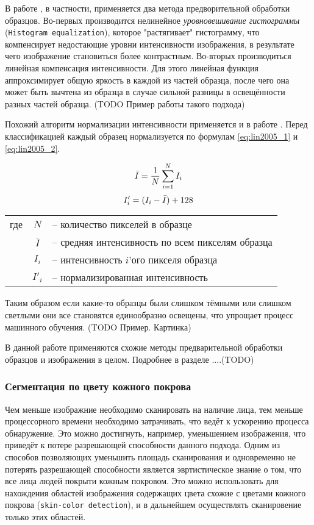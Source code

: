 \documentclass[12pt]{report}
\begin{document}
В работе \citep{rowley1998neural}, в частности, применяется два метода предворительной обработки образцов. Во-первых производится нелинейное \emph{уровновешивание гистограммы} (\texttt{Histogram equalization}), которое "растягивает" гистограмму, что компенсирует недостающие уровни интенсивности изображения, в результате чего изображение становиться более контрастным. Во-вторых производиться линейная компенсация интенсивности. Для этого линейная функция аппроксимирует общую яркость в каждой из частей образца, после чего она может быть вычтена из образца в случае сильной разницы в освещённости разных частей образца. (TODO Пример работы такого подхода) 

Похожий алгоритм нормализации интенсивности применяется и в работе \citep{lin2005face}. Перед классификацией каждый образец нормализуется по формулам \ref{eq:lin2005_1} и \ref{eq:lin2005_2}.

\begin{equation}
\label{eq:lin2005_1}
\centering
\bar{I}=\frac{1}{N}\sum_{i=1}^{N}I_{i}
\end{equation}
\begin{equation}
\label{eq:lin2005_2}
\centering
{I}'_i=(I_i-\bar{I})+128
\end{equation}

\begin{tabular}{p{3cm} c l}
где & $N$ & -- количество пикселей в образце\\
	& $\bar{I}$ & -- средняя интенсивность по всем пикселям образца\\
	& $I_i$ & -- интенсивность $i$'ого пикселя образца\\
	& ${I}'_i$ & -- нормализированная интенсивность\\
\end{tabular}

Таким образом если какие-то образцы были слишком тёмными или слишком светлыми они все становятся единообразно освещены, что упрощает процесс машинного обучения. (TODO Пример. Картинка)

В данной работе применяются схожие методы предварительной обработки образцов и изображения в целом. Подробнее в разделе ....(TODO)

\subsubsection{Сегментация по цвету кожного покрова}
Чем меньше изображние необходимо сканировать на наличие лица, тем меньше процессорного времени необходимо затрачивать, что ведёт к ускорению процесса обнаружение. Это можно достигнуть, например, уменьшением изображения, что приведёт к потере разрешающей способности данного подхода. Одним из способов позволяющих уменьшить площадь сканирования и одновременно не потерять разрешающей способности является эвртистическое знание о том, что все лица людей покрыти кожным покровом. Это можно использовать для нахождения областей изображения содержащих цвета схожие с цветами кожного покрова (\texttt{skin-color detection}), и в дальнейшем осуществлять сканировение только этих областей.
\end{document}
